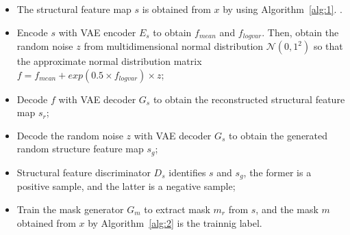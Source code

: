 \documentclass{ecai}
\begin{document}
\begin{itemize}
	\item The structural feature map $s$ is obtained from $x$ by using Algorithm~\ref{alg:1}. .
	\item Encode $s$ with VAE encoder $E_s$ to obtain $f_{mean}$ and $f_{logvar}$. Then, obtain the random noise $z$ from multidimensional normal distribution $\mathcal{N}(0,1^2)$ so that the approximate normal distribution matrix  $f=f_{mean}+exp(0.5\times f_{logvar})\times z$;
	\item Decode $f$ with VAE decoder $G_s$ to obtain the reconstructed structural feature map $s_r$;
	\item Decode the random noise $z$ with VAE decoder $G_s$ to obtain the generated random structure feature map $s_g$;
	\item Structural feature discriminator $D_{s}$ identifies $s$ and $s_g$, the former is a positive sample, and the latter is a negative sample;
	\item Train the mask generator $G_m$ to extract mask $m_r$ from $s$, and the mask $m$ obtained from $x$ by Algorithm~\ref{alg:2} is the trainnig label.
\end{itemize}
\end{document}
